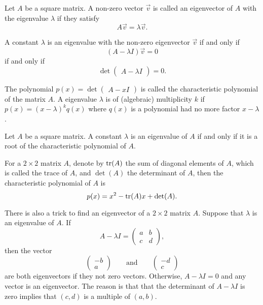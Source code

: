 Let $A$ be a square matrix. A non-zero vector $\vec{v}$ is called an eigenvector of $A$ with the eigenvalue $\lambda$ if they satisfy
\[A\vec{v} = \lambda \vec{v}.\]

A constant $\lambda$ is an eigenvalue with the non-zero eigenvector $\vec{v}$ if and only if 
\[
  (A - \lambda I) \vec{v}=0
\] 
if and only if
\[
\det\begin{pmatrix}
  A-\lambda I
\end{pmatrix}=0. 
\]

The polynomial $p(x)=\det\begin{pmatrix} A-xI \end{pmatrix}$ is called the characteristic polynomial of the matrix $A$. A eigenvalue $\lambda$ is of (algebraic) multiplicity $k$ if $p(x)=(x-\lambda)^kq(x)$ where $q(x)$ is a polynomial had no more factor $x-\lambda$. 

\begin{theorem}
Let $A$ be a square matrix. A constant $\lambda$ is an eigenvalue of $A$ if and only if it is a root of the characteristic polynomial of $A$.
\end{theorem}

For a $2\times 2$ matrix $A$, denote by $\operatorname{tr}(A)$ the sum of diagonal elements of $A$, which is called the trace of $A$, and $\det(A)$ the determinant of $A$, then the characteristic polynomial of $A$ is
\[p(x)=x^2-\operatorname{tr}(A)x+\det(A).\]

There is also a trick to find an eigenvector of a $2\times 2$ matrix $A$.
Suppose that $\lambda$ is an eigenvalue of $A$. If
\[
  A-\lambda I=
\begin{pmatrix}
  a & b\\
  c & d
\end{pmatrix},  
\]
then the vector 
\[\begin{pmatrix}
  -b \\ a
\end{pmatrix} \qquad \text{and}\qquad \begin{pmatrix}
  -d \\  c
\end{pmatrix}\] 
are both eigenvectors if they not zero vectors. Otherwise, $A-\lambda I=0$ and any vector is an eigenvector. The reason is that that the determinant of $A-\lambda I$ is zero implies that $(c, d)$ is a multiple of $(a, b)$. 

